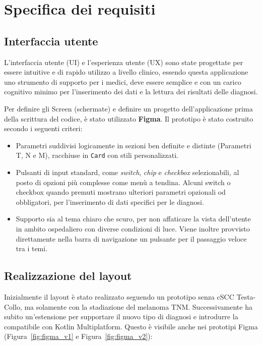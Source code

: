 \section{Specifica dei requisiti}\label{sec:specifica-requisiti}

\subsection{Interfaccia utente}\label{subsec:interfaccia-utente}

L'interfaccia utente (UI) e l'esperienza utente (UX) sono state progettate per essere intuitive e di rapido utilizzo a livello clinico,
essendo questa applicazione uno strumento di supporto per i medici, deve essere semplice e con un carico cognitivo minimo per l'inserimento dei dati
e la lettura dei risultati delle diagnosi.

Per definire gli Screen (schermate) e definire un progetto dell'applicazione prima della scrittura del codice, è stato utilizzato \textbf{Figma}.
Il prototipo è stato costruito secondo i seguenti criteri:
\begin{itemize}
    \item Parametri suddivisi logicamente in sezioni ben definite e distinte (Parametri T, N e M), racchiuse in \texttt{Card} con stili personalizzati.
    \item Pulsanti di input standard, come \textit{switch}, \textit{chip} e \textit{checkbox} selezionabili, al posto di
    opzioni più complesse come menù a tendina.
    Alcuni switch o checkbox quando premuti mostrano ulteriori parametri opzionali od obbligatori, per l'inserimento di dati specifici per le diagnosi.
    \item Supporto sia al tema chiaro che scuro, per non affaticare la vista dell'utente in ambito ospedaliero con diverse condizioni di luce.
    Viene inoltre provvisto direttamente nella barra di navigazione un pulsante per il passaggio veloce tra i temi.
\end{itemize}

\subsection{Realizzazione del layout}\label{subsec:realizzazione-layout}

Inizialmente il layout è stato realizzato seguendo un prototipo senza cSCC Testa-Collo, ma solamente con la stadiazione del melanoma TNM.
Successivamente ha subito un'estensione per supportare il nuovo tipo di diagnosi e introdurre la compatibile con Kotlin Multiplatform.
Questo è visibile anche nei prototipi Figma (Figura~\ref{fig:figma_v1} e Figura~\ref{fig:figma_v2}):

